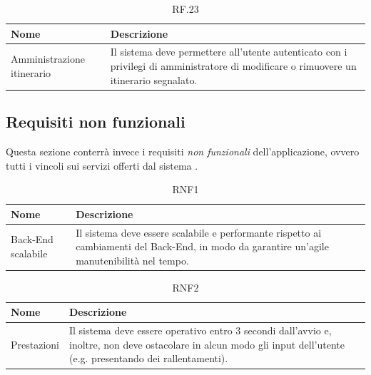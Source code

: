 \documentclass{natourDoc}
\begin{document}
\begin{table}[H]
	\centering
	\begin{tabular}{ |p{5cm}|p{10.3cm}| }
		\hline
		\rowcolor{PineGreen!70}
		\textbf{Nome}              & \textbf{Descrizione}                                                                                \\
		\hline
		Amministrazione itinerario & Il sistema deve permettere all'utente autenticato con i privilegi di amministratore di modificare o
		rimuovere un itinerario segnalato.                                                                                               \\
		\hline
	\end{tabular}
	\caption{RF.23}
\end{table}

\newpage
\subsection{Requisiti non funzionali}
Questa sezione conterrà invece i requisiti \textit{non funzionali} dell'applicazione, ovvero tutti i vincoli sui servizi offerti dal sistema .

\begin{table}[H]
	\centering
	\begin{tabular}{ |p{5cm}|p{10.3cm}| }
		\hline
		\rowcolor{PineGreen!70}
		\textbf{Nome}      & \textbf{Descrizione}                                                                 \\
		\hline
		Back-End scalabile & Il sistema deve essere scalabile e performante rispetto ai cambiamenti del Back-End,
		in modo da garantire un'agile manutenibilità nel tempo.                                                   \\
		\hline
	\end{tabular}
	\caption{RNF1}
\end{table}

\begin{table}[H]
	\centering
	\begin{tabular}{ |p{5cm}|p{10.3cm}| }
		\hline
		\rowcolor{PineGreen!70}
		\textbf{Nome} & \textbf{Descrizione}                                                                           \\
		\hline
		Prestazioni   & Il sistema deve essere operativo entro 3 secondi dall'avvio e, inoltre, non deve ostacolare in
		alcun modo gli input dell'utente (e.g. presentando dei rallentamenti).                                         \\
		\hline
	\end{tabular}
	\caption{RNF2}
\end{table}
\end{document}

